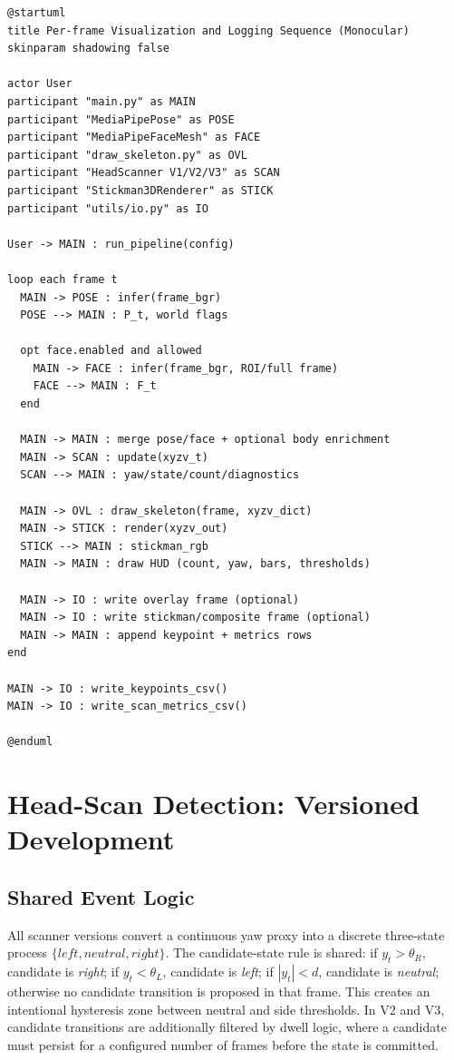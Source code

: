 \documentclass[11pt,a4paper]{article}
\begin{document}
\begin{lstlisting}
@startuml
title Per-frame Visualization and Logging Sequence (Monocular)
skinparam shadowing false

actor User
participant "main.py" as MAIN
participant "MediaPipePose" as POSE
participant "MediaPipeFaceMesh" as FACE
participant "draw_skeleton.py" as OVL
participant "HeadScanner V1/V2/V3" as SCAN
participant "Stickman3DRenderer" as STICK
participant "utils/io.py" as IO

User -> MAIN : run_pipeline(config)

loop each frame t
  MAIN -> POSE : infer(frame_bgr)
  POSE --> MAIN : P_t, world flags

  opt face.enabled and allowed
    MAIN -> FACE : infer(frame_bgr, ROI/full frame)
    FACE --> MAIN : F_t
  end

  MAIN -> MAIN : merge pose/face + optional body enrichment
  MAIN -> SCAN : update(xyzv_t)
  SCAN --> MAIN : yaw/state/count/diagnostics

  MAIN -> OVL : draw_skeleton(frame, xyzv_dict)
  MAIN -> STICK : render(xyzv_out)
  STICK --> MAIN : stickman_rgb
  MAIN -> MAIN : draw HUD (count, yaw, bars, thresholds)

  MAIN -> IO : write overlay frame (optional)
  MAIN -> IO : write stickman/composite frame (optional)
  MAIN -> MAIN : append keypoint + metrics rows
end

MAIN -> IO : write_keypoints_csv()
MAIN -> IO : write_scan_metrics_csv()

@enduml
\end{lstlisting}

\section{Head-Scan Detection: Versioned Development}
\subsection{Shared Event Logic}
All scanner versions convert a continuous yaw proxy into a discrete three-state process \(\{\textit{left}, \textit{neutral}, \textit{right}\}\). The candidate-state rule is shared: if \(y_t > \theta_R\), candidate is \textit{right}; if \(y_t < \theta_L\), candidate is \textit{left}; if \(|y_t| < d\), candidate is \textit{neutral}; otherwise no candidate transition is proposed in that frame. This creates an intentional hysteresis zone between neutral and side thresholds. In V2 and V3, candidate transitions are additionally filtered by dwell logic, where a candidate must persist for a configured number of frames before the state is committed.
\end{document}
